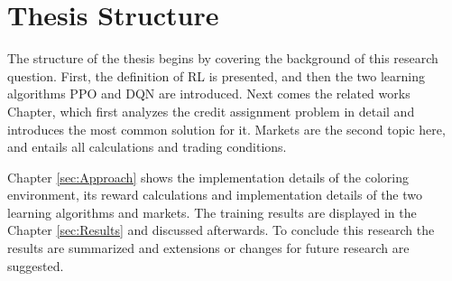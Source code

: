 \section{Thesis Structure}
The structure of the thesis begins by covering the background of this research question. First, the definition of RL is presented, and then the two learning algorithms PPO and DQN are introduced. Next comes the related works Chapter, which first analyzes the credit assignment problem in detail and introduces the most common solution for it. Markets are the second topic here, and entails all calculations and trading conditions. 

Chapter \ref{sec:Approach} shows the implementation details of the coloring environment, its reward calculations and implementation details of the two learning algorithms and markets. The training results are displayed in the Chapter \ref{sec:Results} and discussed afterwards. To conclude this research the results are summarized and extensions or changes for future research are suggested.